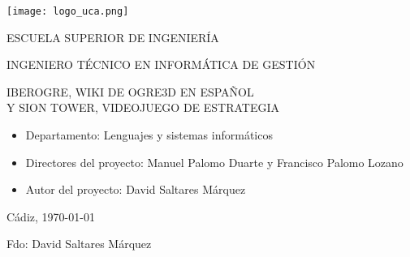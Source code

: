 

\begin{center}

  \texttt{[image: logo\_uca.png]} \\

  \vspace{2.0cm}

  \Large{ESCUELA SUPERIOR DE INGENIERÍA} \\

  \vspace{1.0cm}

  \large{INGENIERO TÉCNICO EN INFORMÁTICA DE GESTIÓN} \\

  \vspace{2.0cm}

  \large{IBEROGRE, WIKI DE OGRE3D EN ESPAÑOL\\Y SION TOWER, VIDEOJUEGO DE ESTRATEGIA} \\

  \vspace{1.0cm}

\end{center}

\begin{itemize}
\item \large{Departamento: Lenguajes y sistemas informáticos}
\item \large{Directores del proyecto: Manuel Palomo Duarte y Francisco Palomo Lozano}
\item \large{Autor del proyecto: David Saltares Márquez}
\end{itemize}

\vspace{1.0cm}

\begin{flushright}
  \large{Cádiz, \today} \\

  \vspace{2.5cm}

  \large{Fdo: David Saltares Márquez}
\end{flushright}
